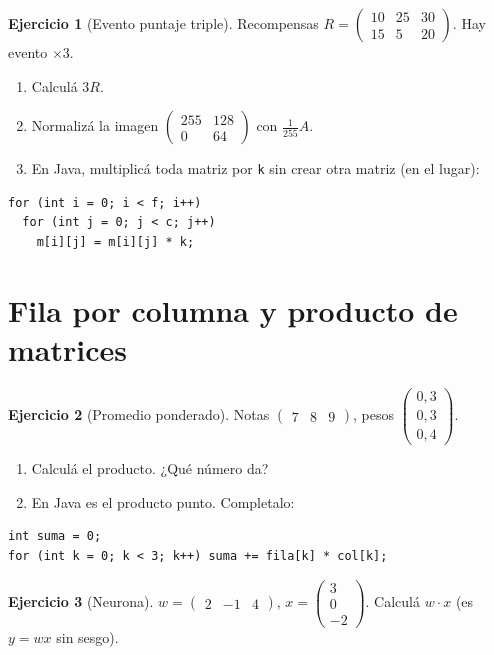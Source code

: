 \documentclass[a4paper,12pt]{article}
\theoremstyle{definition}
\newtheorem{ejercicio}{Ejercicio}[section]
\begin{document}
\begin{ejercicio}[Evento puntaje triple]
Recompensas $R = \begin{pmatrix} 10 & 25 & 30 \\ 15 & 5 & 20 \end{pmatrix}$. Hay evento $\times 3$.
\begin{enumerate}[label=\alph*)]
\item Calculá $3R$.
\item Normalizá la imagen $\begin{pmatrix} 255 & 128 \\ 0 & 64 \end{pmatrix}$ con $\frac{1}{255}A$.
\item En Java, multiplicá toda matriz por \texttt{k} sin crear otra matriz (en el lugar):
\end{enumerate}
\begin{lstlisting}
for (int i = 0; i < f; i++)
  for (int j = 0; j < c; j++)
    m[i][j] = m[i][j] * k;
\end{lstlisting}
\end{ejercicio}

\section{Fila por columna y producto de matrices}
\begin{ejercicio}[Promedio ponderado]
Notas $\begin{pmatrix} 7 & 8 & 9 \end{pmatrix}$, pesos $\begin{pmatrix} 0{,}3 \\ 0{,}3 \\ 0{,}4 \end{pmatrix}$.
\begin{enumerate}[label=\alph*)]
\item Calculá el producto. ¿Qué número da?
\item En Java es el producto punto. Completalo:
\end{enumerate}
\begin{lstlisting}
int suma = 0;
for (int k = 0; k < 3; k++) suma += fila[k] * col[k];
\end{lstlisting}
\end{ejercicio}

\begin{ejercicio}[Neurona]
$w = \begin{pmatrix} 2 & -1 & 4 \end{pmatrix}$, $x = \begin{pmatrix} 3 \\ 0 \\ -2 \end{pmatrix}$. Calculá $w \cdot x$ (es $y = wx$ sin sesgo).
\end{ejercicio}
\end{document}

